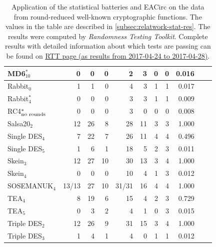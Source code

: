 \documentclass[
    digital,    %
    oneside,    %
    color,
    11pt,
    nocover,
    notable,
    nolof,
    nolot,
]{fithesis3}
\newcommand{\fd}{\cellcolor{myred!15}}
\newcommand{\fn}{\cellcolor{mygreen!20}}
\begin{document}
\begin{table}[H]
\begin{tabular}{@{}l|rrrrrrrrrr@{}}
MD6$_{10}^{\ast}$                &  0    \fn &  0 \fn &  0 \fn   &  2    \fn &  3 \fd & 0 \fn & 0 \fn & 0.016 \fn \\ \hline
Rabbit$_{0}$                     &  1    \fn &  1 \fn &  0 \fn   &  4    \fd &  3 \fd & 1 \fn & 1 \fn & 0.017 \fn \\
Rabbit$_{4}^{\ast}$              &  0    \fn &  0 \fn &  0 \fn   &  3    \fn &  3 \fd & 1 \fn & 1 \fn & 0.009 \fn \\ \hline
RC4$_{\textnormal{no rounds}}^{\ast}$ &  0 \fn &  0 \fn &  0 \fn &  3    \fn &  0 \fn & 0 \fn & 0 \fn & 0.008 \fn \\ \hline
Salsa20$_{2}$                    & 12    \fd & 26 \fd &  8 \fd   & 28    \fd & 11 \fd & 3 \fd & 3 \fd & 1.000 \fd \\ \hline
Single DES$_{4}$                 &  7    \fd & 22 \fd &  7 \fd   & 26    \fd & 11 \fd & 4 \fd & 4 \fd & 0.496 \fd \\
Single DES$_{5}$                 &  1    \fn &  6 \fd &  1 \fn   & 18    \fd &  5 \fd & 2 \fd & 3 \fd & 0.011 \fn \\ \hline
Skein$_{3}$                      & 12    \fd & 27 \fd & 10 \fd   & 30    \fd & 13 \fd & 3 \fd & 4 \fd & 1.000 \fd \\
Skein$_{4}$                      &  0    \fn &  0 \fn &  0 \fn   & 10    \fd &  4 \fd & 1 \fn & 3 \fd & 0.012 \fn \\ \hline
SOSEMANUK$_{4}$                  & 13/13 \fd & 27 \fd & 10 \fd   & 31/31 \fd & 16 \fd & 4 \fd & 4 \fd & 1.000 \fd \\ \hline
TEA$_{4}$                        &  8    \fd & 19 \fd &  6 \fd   & 15    \fd &  4 \fd & 2 \fd & 3 \fd & 0.729 \fd \\
TEA$_{5}$                        &  0    \fn &  3 \fn &  2 \fn   &  4    \fd &  1 \fn & 0 \fn & 3 \fd & 0.015 \fn \\ \hline
Triple DES$_{2}$                 & 12    \fd & 26 \fd &  9 \fd   & 31    \fd & 15 \fd & 3 \fd & 4 \fd & 1.000 \fd \\
Triple DES$_{3}$                 &  1    \fn &  4 \fd &  1 \fn   &  4    \fd &  0 \fn & 1 \fn & 1 \fn & 0.012 \fn \\

\end{tabular}

\caption{Application of the statistical batteries and EACirc on the data from round-reduced well-known cryptographic functions. 
The values in the table are described in \cref{subsec:relatwork-stat-res}.
The results were computed by \textit{Randomness Testing Toolkit}. Complete results with detailed information about which tests are passing can be found on \href{http://rtt.ics.muni.cz/ViewResults/?created_from=2017-04-24+12\%3A00\%3A00&created_to=2017-04-29+00\%3A00\%3A00}{RTT page (as results from 2017-04-24 to 2017-04-28)}.}
\label{table:res-batteries}
\end{table}
\end{document}
